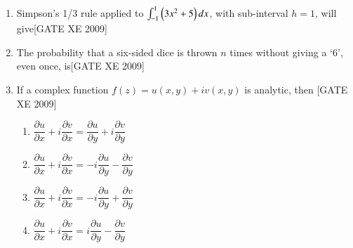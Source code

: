 \documentclass[journal,12pt,onecolumn]{IEEEtran}
\theoremstyle{remark}
\begin{document}
\begin{enumerate}
\item Simpson's 1/3 rule applied to $\int_{-1}^1 \left(3x^2 + 5\right)dx$, with sub-interval $h=1$, will give\hfill[GATE XE 2009]
\begin{enumerate}
 \end{enumerate}   

\item The probability that a six-sided dice is thrown $n$ times without giving a `6', even once, is\hfill[GATE XE 2009]
    \begin{enumerate}
 \end{enumerate}   

\item If a complex function $f(z) = u(x, y) + i v(x, y)$ is analytic, then \hfill[GATE XE 2009]
      \begin{multicols}{2}
\begin{enumerate}
 

           \item     $\dfrac{\partial u}{\partial x} + i \dfrac{\partial v}{\partial x} = \dfrac{\partial u}{\partial y} + i \dfrac{\partial v}{\partial y}$ 
       \item  $\dfrac{\partial u}{\partial x} + i \dfrac{\partial v}{\partial x} = -i\dfrac{\partial u}{\partial y} - \dfrac{\partial v}{\partial y}$ 
         \item $\dfrac{\partial u}{\partial x} + i \dfrac{\partial v}{\partial x} = -i\dfrac{\partial u}{\partial y} + \dfrac{\partial v}{\partial y}$ 
        \item     $\dfrac{\partial u}{\partial x} + i \dfrac{\partial v}{\partial x} = i\dfrac{\partial u}{\partial y} - \dfrac{\partial v}{\partial y}$ 
    \end{enumerate}
 \end{multicols}


\end{enumerate}
\end{document}
